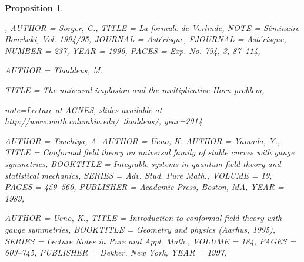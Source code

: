 \documentclass[11pt]{amsart}
\newtheorem{proposition}[theorem]{Proposition}
\numberwithin{theorem}{subsection}
\begin{document}
{\begin{proposition}
\begin{bibdiv}
\begin{biblist}

{} {,
    AUTHOR = {Sorger, C.},
     TITLE = {La formule de {V}erlinde},
      NOTE = {S\'{e}minaire Bourbaki, Vol. 1994/95},
   JOURNAL = {Ast\'{e}risque},
  FJOURNAL = {Ast\'{e}risque},
    NUMBER = {237},
      YEAR = {1996},
     PAGES = {Exp. No. 794, 3, 87--114},
}
 {
     AUTHOR = {Thaddeus, M.}

     TITLE = {The universal implosion
and the multiplicative Horn problem},

		note={Lecture at AGNES, slides available at http://www.math.columbia.edu/~thaddeus/},
		year={2014}


}

 {
    AUTHOR = {Tsuchiya, A.}
    AUTHOR = {Ueno, K.}
    AUTHOR = {Yamada, Y.},
     TITLE = {Conformal field theory on universal family of stable curves
              with gauge symmetries},
 BOOKTITLE = {Integrable systems in quantum field theory and statistical
              mechanics},
    SERIES = {Adv. Stud. Pure Math.},
    VOLUME = {19},
     PAGES = {459--566},
 PUBLISHER = {Academic Press, Boston, MA},
      YEAR = {1989},
}

 {
    AUTHOR = {Ueno, K.},
     TITLE = {Introduction to conformal field theory with gauge symmetries},
 BOOKTITLE = {Geometry and physics ({A}arhus, 1995)},
    SERIES = {Lecture Notes in Pure and Appl. Math.},
    VOLUME = {184},
     PAGES = {603--745},
 PUBLISHER = {Dekker, New York},
      YEAR = {1997},
}


\end{biblist}
\end{bibdiv}
\end{proposition}}
\end{document}
